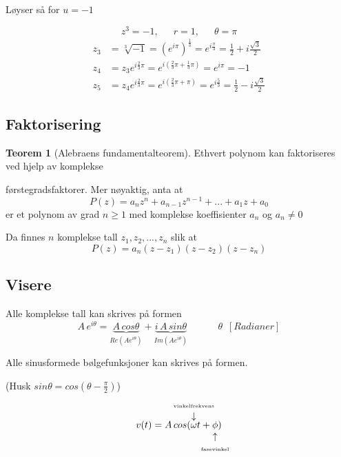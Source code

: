 \documentclass[11pt]{article}
\theoremstyle{definition}
\theoremstyle{definition}
\theoremstyle{definition}
\theoremstyle{definition}
\newtheorem{teo}{Teorem}[section]
\newenvironment{fteo}
{\begin{mdframed}[style=minstil]\begin{teo}}
		{\end{teo}\end{mdframed}}
\theoremstyle{definition}
\theoremstyle{definition}
\begin{document}
		Løyser så for \(u=-1\)
		
		\[z^3=-1, \hspace{18pt}r=1, \hspace{18pt} \theta=\pi \]
		\begin{align*}
			z_3&=\sqrt[3]{-1}=\left( e^{i\pi} \right)^{\frac{1}{3}}=e^{i\frac{\pi}{3}}=\frac{1}{2}+i\frac{\sqrt{3}}{2}\\
			z_4&=z_3e^{i\frac{2}{3}\pi}=e^{i\left( \frac{2}{3}\pi+\frac{1}{3}\pi \right)}=e^{i\pi}=-1\\
			z_5&=z_4e^{i\frac{2}{3}\pi}=e^{i\left( \frac{2}{3}\pi+\pi \right)}=e^{i\frac{5}{3}}=\frac{1}{2}-i\frac{\sqrt{3}}{2}
		\end{align*}
		\newpage
		
		\subsection{Faktorisering}
		
		\begin{fteo}[Alebraens fundamentalteorem]\leavevmode
			
			Ethvert polynom kan faktoriseres ved hjelp av komplekse
			
			 førstegradsfaktorer. Mer nøyaktig, anta at \[P(z)=a_nz^n+a_{n-1}z^{n-1}+...+a_1z+a_0 \]
			er et polynom av grad \(n\geq 1 \) med komplekse koeffisienter \(a_n\) og \(a_n\neq 0 \)
			
			Da finnes \(n\) komplekse tall \(z_1,z_2,...,z_n\) slik at
			\[P(z)=a_n(z-z_1)(z-z_2)(z-z_n)\]
			
		\end{fteo}
		
		\newpage
		
		\subsection{Visere}
		
		Alle komplekse tall kan skrives på formen
		\begin{equation}
			A\,e^{i\theta}=\underbrace{A\,cos\theta}_{Re(Ae^{i\theta})} + \underbrace{i\,A\,sin\theta}_{Im(Ae^{i\theta})}
			\hspace{38pt} \theta \,\,\,[Radianer] 
		\end{equation}
		
		Alle sinusformede bølgefunksjoner kan skrives på formen. 
		
		(Husk 		
		\(sin\theta=cos(\theta-\frac{\pi}{2}) \)) 
		\[v(t)=A\,cos(\overarrow[\omega][\downarrow]{{\tiny vinkelfrekvens}}t+\underarrow[\phi][\uparrow]{{\tiny fasevinkel}})\] 
		
\end{document}
